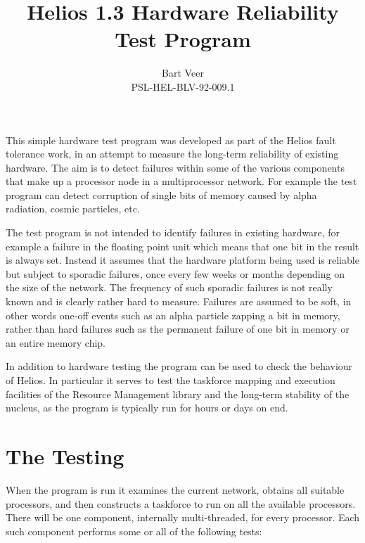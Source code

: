 \title{Helios 1.3 Hardware Reliability Test Program}
\author{Bart Veer \\ PSL-HEL-BLV-92-009.1}
\date{}


\maketitle

This simple hardware test program was developed as part of the Helios
fault tolerance work, in an attempt to measure the long-term reliability
of existing hardware. The aim is to detect failures within some of the
various components that make up a processor node in a multiprocessor network.
For example the test program can detect corruption of single bits of
memory caused by alpha radiation, cosmic particles, etc.

The test program is not intended to identify failures in existing
hardware, for example a failure in the floating point unit which means
that one bit in the result is always set. Instead it assumes that the
hardware platform being used is reliable but subject to sporadic failures,
once every few weeks or months depending on the size of the network.
The frequency of such sporadic failures is not really known and is
clearly rather hard to measure. Failures are assumed to be soft, in other
words one-off events such as an alpha particle zapping a bit in memory,
rather than hard failures such as the permanent failure of one bit in
memory or an entire memory chip.

In addition to hardware testing the program can be used to check
the behaviour of Helios. In particular it serves to test the taskforce
mapping and execution facilities of the Resource Management library 
and the long-term stability of the nucleus, as the program is typically
run for hours or days on end.

\section{The Testing}

When the program is run it examines the current network, obtains all
suitable processors, and then constructs a taskforce to run on all
the available processors. There will be one component, internally
multi-threaded, for every processor. Each such component performs
some or all of the following tests:

